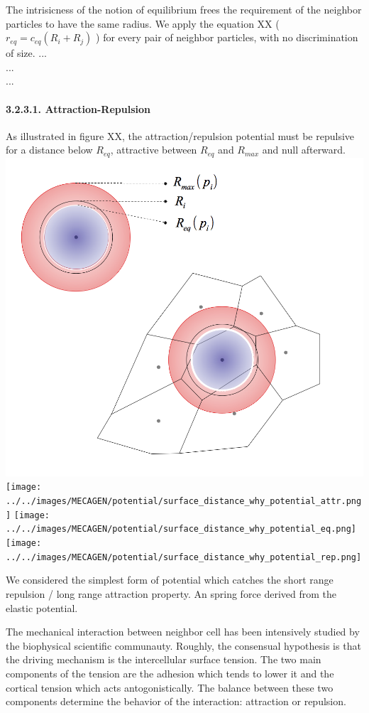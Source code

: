 The intrisicness of the notion of equilibrium frees the requirement of the neighbor particles to have the same radius. We apply the equation XX ( $r_{eq} = c_{eq} \left ( R_i + R_j \right )$ ) for every pair of neighbor particles, with no discrimination of size.      ...
\\ ...
\\ ...
\\

\paragraph{3.2.3.1. Attraction-Repulsion  }

As illustrated in figure XX, the attraction/repulsion potential must be repulsive for a distance below $R_{eq}$, attractive between $R_{eq}$ and $R_{max}$ and null afterward.
\includegraphics{../../images/MECAGEN/potential/surface_distance_why_potential.png}
\texttt{[image: ../../images/MECAGEN/potential/surface\_distance\_why\_potential\_attr.png]}
\texttt{[image: ../../images/MECAGEN/potential/surface\_distance\_why\_potential\_eq.png]}
\texttt{[image: ../../images/MECAGEN/potential/surface\_distance\_why\_potential\_rep.png]}

We considered the simplest form of potential which catches the short range repulsion / long range attraction property. An spring force derived from the elastic potential.

The mechanical interaction between neighbor cell has been intensively studied by the biophysical scientific communauty. Roughly, the consensual hypothesis is that the driving mechanism is the intercellular surface tension. The two main components of the tension are the adhesion which tends to lower it and the cortical tension which acts antogonistically. The balance between these two components determine the behavior of the interaction: attraction or repulsion. 

